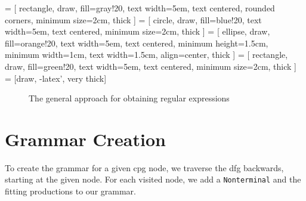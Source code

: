  = [
	rectangle, 
	draw, 
	fill=gray!20, 
	text width=5em, 
	text centered, 
	rounded corners, 
	minimum size=2cm,
	thick
	]
 = [
	circle, 
	draw, 
	fill=blue!20, 
	text width=5em, 
	text centered,
	minimum size=2cm,
	thick
]
 = [
	ellipse, 
	draw, 
	fill=orange!20, 
	text width=5em, 
	text centered,
	minimum height=1.5cm,
	minimum width=1cm,
	text width=1.5cm,
	align=center,
	thick
	]
 = [
	rectangle, 
	draw, 
	fill=green!20, 
	text width=5em, 
	text centered, 
	minimum size=2cm,
	thick
	]
 = [draw, -latex', very thick]
\begin{figure}[H]
	\centering
{}
\caption{The general approach for obtaining regular expressions}
\label{fig:approach}
\end{figure}


\section{Grammar Creation}\label{sec:grammarCreation}
To create the grammar for a given \ac{cpg} node, we traverse the \ac{dfg} backwards, starting at the given node. 
For each visited node, we add a \lstinline|Nonterminal| and the fitting productions to our grammar. 

